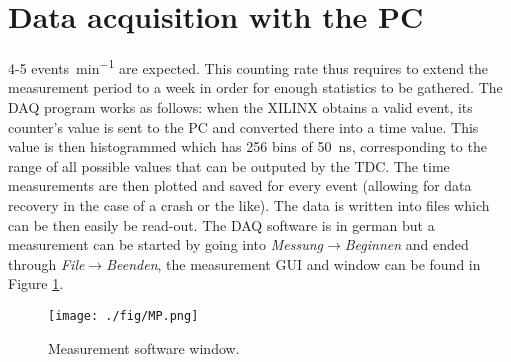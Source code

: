\section{Data acquisition with the PC}

4-5 \si{events\per\minute} are expected. This counting rate thus requires to extend the measurement period to a week in order for enough statistics to be gathered. The DAQ program works as follows: when the XILINX obtains a valid event, its counter's value is sent to the PC and converted there into a time value. This value is then histogrammed which has 256 bins of \SI{50}{\nano\second}, corresponding to the range of all possible values that can be outputed by the TDC. The time measurements are then plotted and saved for every event (allowing for data recovery in the case of a crash or the like). The data is written into files which can be then easily be read-out. The DAQ software is in german but a measurement can be started by going into \textit{Messung}$\rightarrow$\textit{Beginnen} and ended through \textit{File}$\rightarrow$\textit{Beenden}, the measurement GUI and window can be found in Figure \ref{fig:MP}.

\begin{figure}
\centering
\texttt{[image: ./fig/MP.png]}
\caption{Measurement software window.}
\label{fig:MP}
\end{figure}
